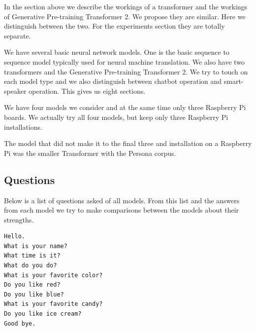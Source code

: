 

In the section above we describe the workings of a transformer and the workings of Generative Pre-training Transformer 2. We propose they are similar. Here we distinguish between the two. For the experiments section they are totally separate.

We have several basic neural network models. One is the basic sequence to sequence model typically used for neural machine translation. We also have two transformers and the Generative Pre-training Transformer 2. We try to touch on each model type and we also distinguish between chatbot operation and smart-speaker operation. This gives us eight sections. 


We have four models we consider and at the same time only three Raspberry Pi boards. We actually try all four models, but keep only three Raspberry Pi installations. 


The model that did not make it to the final three and installation on a Raspberry Pi was the smaller Transformer with the Persona corpus.

\subsection*{Questions}
Below is a list of questions asked of all models. From this list and the answers from each model we try to make comparisons between the models about their strengths.

\begin{verbatim}
Hello.
What is your name? 
What time is it?
What do you do?
What is your favorite color?
Do you like red?
Do you like blue?
What is your favorite candy?
Do you like ice cream?
Good bye.
\end{verbatim}

